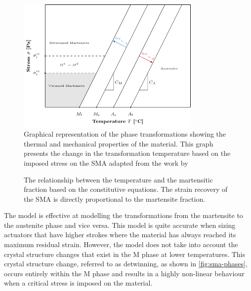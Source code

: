 \begin{figure}[hbt]
    \centering
    \includegraphics[width=0.80\textwidth]{images/chap2/phase-diagram-graph.pdf}
    \caption[Graphical representation of the phase transformations showing the thermal and mechanical properties of the material]{Graphical representation of the phase transformations showing the thermal and mechanical properties of the material. This graph presents the change in the transformation temperature based on the imposed stress on the SMA adapted from the work by \cite{ricciardiChapterExperimentalCharacterization2021}}
    \label{fig:phase-diagram-graph}
\end{figure}

\begin{figure}[hbt]
    \centering
    \resizebox{0.75\textwidth}{!}{}
    \caption[The relationship between the temperature and the martensitic fraction based on the \cite{brinsonOneDimensionalConstitutiveBehavior1993} constitutive equations]{The relationship between the temperature and the martensitic fraction based on the \cite{brinsonOneDimensionalConstitutiveBehavior1993} constitutive equations. The strain recovery of the SMA is directly proportional to the martensite fraction.}
    \label{fig:sma-temperature-transformation-model}
\end{figure}

The \cite{liangConstitutiveModelingShape1990a} model is effective at modelling the transformations from the martensite to the austenite phase and vice versa. This model is quite accurate when sizing actuators that have higher strokes where the material has always reached its maximum residual strain. However, the model does not take into account the crystal structure changes that exist in the M phase at lower temperatures. This crystal structure change, referred to as detwinning, as shown in \cref{fig:sma-phases}, occurs entirely within the M phase and results in a highly non-linear behaviour when a critical stress is imposed on the material.

